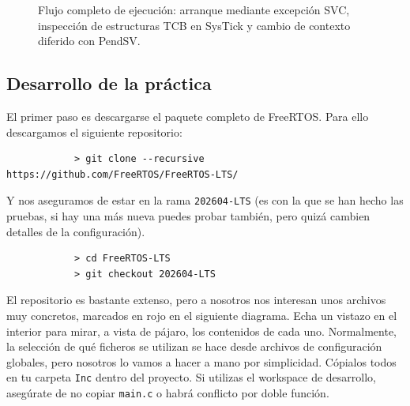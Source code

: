 \documentclass[../main.tex]{subfiles}
\begin{document}
\begin{figure}[htbp]
                \caption{Flujo completo de ejecución: arranque mediante excepción SVC, inspección de estructuras TCB en SysTick y cambio de contexto diferido con PendSV.}
                \label{fig:rtos_execution_flow}
            \end{figure}

    \subsection{Desarrollo de la práctica}

        El primer paso es descargarse el paquete completo de FreeRTOS. Para ello descargamos el siguiente repositorio:

        \begin{lstlisting}
            > git clone --recursive https://github.com/FreeRTOS/FreeRTOS-LTS/
        \end{lstlisting}

        Y nos aseguramos de estar en la rama \texttt{202604-LTS} (es con la que se han hecho las pruebas, si hay una más nueva puedes probar también, pero quizá cambien detalles de la configuración).

        \begin{lstlisting}
            > cd FreeRTOS-LTS 
            > git checkout 202604-LTS 
        \end{lstlisting}

        El repositorio es bastante extenso, pero a nosotros nos interesan unos archivos muy concretos, marcados en rojo en el siguiente diagrama. Echa un vistazo en el interior para mirar, a vista de pájaro, los contenidos de cada uno. Normalmente, la selección de qué ficheros se utilizan se hace desde archivos de configuración globales, pero nosotros lo vamos a hacer a mano por simplicidad. Cópialos todos en tu carpeta \texttt{Inc} dentro del proyecto. Si utilizas el workspace de desarrollo, asegúrate de no copiar \texttt{main.c} o habrá conflicto por doble función.
        
\end{document}
